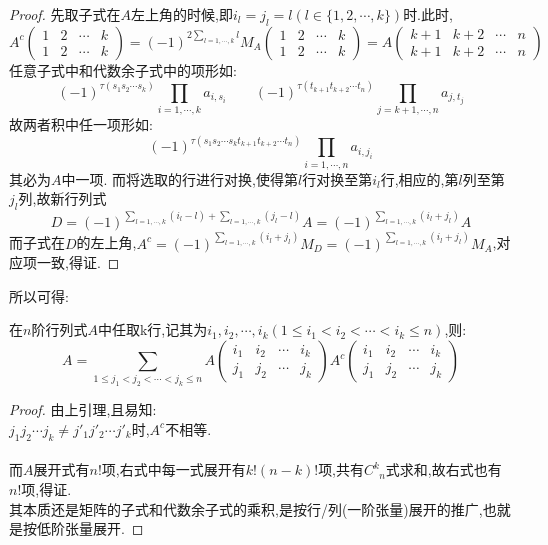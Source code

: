 \documentclass[UTF8,a4paper,notitlepage]{book}
\begin{document}
        \begin{proof}
            先取子式在$A$左上角的时候,即$i_l=j_l=l(l\in \{1,2,\cdots,k\})$时.此时,
            $$A^c \begin{pmatrix}1 & 2 & \cdots & k \\ 1 & 2 & \cdots & k\end{pmatrix}=(-1)^{2\sum_{l=1,\cdots,k}l}M_A \begin{pmatrix}1 & 2 & \cdots & k \\ 1 & 2 & \cdots & k\end{pmatrix}=A\begin{pmatrix}{k+1} & {k+2} & \cdots & n \\ {k+1} & {k+2} & \cdots & n\end{pmatrix}$$
            任意子式中和代数余子式中的项形如:
            $$(-1)^{\tau(s_1s_2\cdots s_k)}\prod_{i=1,\cdots,k}a_{i,s_i} \qquad (-1)^{\tau(t_{k+1}t_{k+2}\cdots t_n)}\prod_{j=k+1,\cdots,n}a_{j,t_j}$$
            故两者积中任一项形如:
            $$(-1)^{\tau(s_1s_2\cdots s_kt_{k+1}t_{k+2}\cdots t_n)}\prod_{i=1,\cdots,n}a_{i,j_i}$$
            其必为$A$中一项.
            而将选取的行进行对换,使得第$l$行对换至第$i_l$行,相应的,第$l$列至第$j_l$列,故新行列式
            $$D=(-1)^{\sum_{l=1,\cdots,k}(i_l-l)+\sum_{l=1,\cdots,k}(j_l-l)}A=(-1)^{\sum_{l=1,\cdots,k}(i_l+j_l)}A$$
            而子式在$D$的左上角,$A^c=(-1)^{\sum_{l=1,\cdots,k}(i_l+j_l)}M_D=(-1)^{\sum_{l=1,\cdots,k}(i_l+j_l)}M_A$,对应项一致,得证.
        \end{proof}
        所以可得:
        \begin{theorem}[Laplace展开定理]
            在$n$阶行列式$A$中任取k行,记其为$i_1,i_2,\cdots,i_k(1\leq i_1<i_2<\cdots<i_k\leq n)$,则:
            $$A=\sum_{1\leq j_1<j_2<\cdots<j_k\leq n} A\begin{pmatrix}i_1 & i_2 & \cdots & i_k \\ j_1 & j_2 & \cdots & j_k\end{pmatrix}A^c \begin{pmatrix}i_1 & i_2 & \cdots & i_k \\ j_1 & j_2 & \cdots & j_k\end{pmatrix}$$
        \end{theorem}
        \begin{proof}
            由上引理,且易知:\\ 
            $j_1j_2\cdots j_k\neq j'_1j'_2\cdots j'_k$时,$A^c$不相等.
            \paragraph*{}
            而$A$展开式有$n!$项,右式中每一式展开有$k!(n-k)!$项,共有$C^k_{\phantom{k}n}$式求和,故右式也有$n!$项,得证.\\ 
		其本质还是矩阵的子式和代数余子式的乘积,是按行/列(一阶张量)展开的推广,也就是按低阶张量展开.
        \end{proof}
\end{document}
